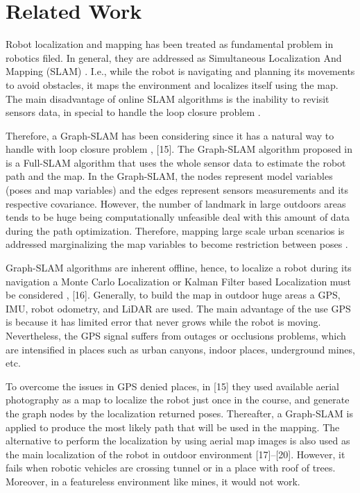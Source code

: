 \chapter{Related Work}

Robot localization and mapping has been treated as fundamental problem in robotics filed. In general, they are addressed as Simultaneous Localization And Mapping (SLAM)  \cite{guivant2012internet, robledo2011outdoor, lohrsemantic, 58segal2009generalized,42montemerlo2007fastslam, 08weingarten2005ekf}. I.e., while the robot is navigating and planning its movements to avoid obstacles, it maps the environment and localizes itself using the map. The main disadvantage of online SLAM algorithms is the inability to revisit sensors data, in special to handle the loop closure problem \cite{10thrun2006graph}.

Therefore, a Graph-SLAM has been considering since it has a natural way to handle with loop closure problem \cite{10thrun2006graph, Levinson-RSS-07, LevinsonT10}, [15]. The Graph-SLAM algorithm proposed in \cite{10thrun2006graph} is a Full-SLAM algorithm that uses the whole sensor data to estimate the robot path and the map. In the Graph-SLAM, the nodes represent model variables (poses and map variables) and the edges represent sensors measurements and its respective covariance. However, the number of landmark in large outdoors areas tends to be huge being computationally unfeasible deal with this amount of data during the path optimization. Therefore, mapping large scale urban scenarios is addressed marginalizing the map variables to become restriction between poses \cite{Levinson-RSS-07, LevinsonT10}. 

Graph-SLAM algorithms are inherent offline, hence, to localize a robot during its navigation a Monte Carlo Localization or Kalman Filter based Localization must be considered \cite{Thrun00j}, [16]. Generally, to build the map in outdoor huge areas a GPS, IMU, robot odometry, and LiDAR are used. The main advantage of the use GPS is because it has limited error that never grows while the robot is moving. Nevertheless, the GPS signal suffers from outages or occlusions problems, which are intensified in places such as urban canyons, indoor places, underground mines, etc.

To overcome the issues in GPS denied places, in [15] they used available aerial photography as a map to localize the robot just once in the course, and generate the graph nodes by the localization returned poses. Thereafter, a Graph-SLAM is applied to produce the most likely path that will be used in the mapping. The alternative to perform the localization by using aerial map images is also used as the main localization of the robot in outdoor environment [17]–[20]. However, it fails when robotic vehicles are crossing tunnel or in a place with roof of trees. Moreover, in a featureless environment like mines, it would not work.

